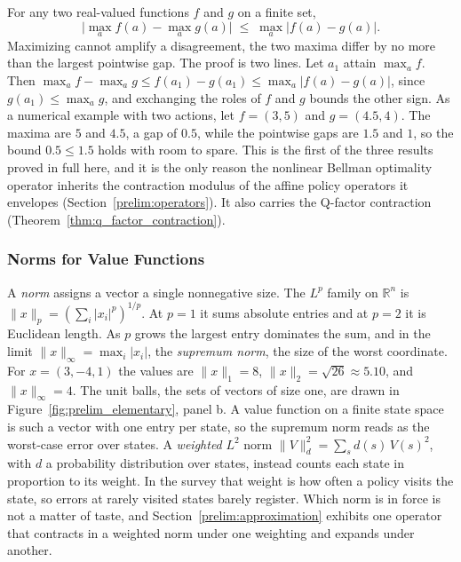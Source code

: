 For any two real-valued functions $f$ and $g$ on a finite set,
\begin{equation}
\big| \max_a f(a) - \max_a g(a) \big| \;\leq\; \max_a |f(a) - g(a)|.
\label{eq:prelim_maxdiff}
\end{equation}
Maximizing cannot amplify a disagreement, the two maxima differ by no more than the largest pointwise gap. The proof is two lines. Let $a_1$ attain $\max_a f$. Then $\max_a f - \max_a g \leq f(a_1) - g(a_1) \leq \max_a |f(a) - g(a)|$, since $g(a_1) \leq \max_a g$, and exchanging the roles of $f$ and $g$ bounds the other sign. As a numerical example with two actions, let $f = (3, 5)$ and $g = (4.5, 4)$. The maxima are $5$ and $4.5$, a gap of $0.5$, while the pointwise gaps are $1.5$ and $1$, so the bound $0.5 \leq 1.5$ holds with room to spare. This is the first of the three results proved in full here, and it is the only reason the nonlinear Bellman optimality operator inherits the contraction modulus of the affine policy operators it envelopes (Section~\ref{prelim:operators}). It also carries the Q-factor contraction (Theorem~\ref{thm:q_factor_contraction}).

\subsubsection{Norms for Value Functions}
\label{prelim:norms}

A \emph{norm} assigns a vector a single nonnegative size. The $L^p$ family on $\mathbb{R}^n$ is $\|x\|_p = (\sum_i |x_i|^p)^{1/p}$. At $p = 1$ it sums absolute entries and at $p = 2$ it is Euclidean length. As $p$ grows the largest entry dominates the sum, and in the limit $\|x\|_\infty = \max_i |x_i|$, the \emph{supremum norm}, the size of the worst coordinate. For $x = (3, -4, 1)$ the values are $\|x\|_1 = 8$, $\|x\|_2 = \sqrt{26} \approx 5.10$, and $\|x\|_\infty = 4$. The unit balls, the sets of vectors of size one, are drawn in Figure~\ref{fig:prelim_elementary}, panel b. A value function on a finite state space is such a vector with one entry per state, so the supremum norm reads as the worst-case error over states. A \emph{weighted} $L^2$ norm $\|V\|_d^2 = \sum_s d(s)\, V(s)^2$, with $d$ a probability distribution over states, instead counts each state in proportion to its weight. In the survey that weight is how often a policy visits the state, so errors at rarely visited states barely register. Which norm is in force is not a matter of taste, and Section~\ref{prelim:approximation} exhibits one operator that contracts in a weighted norm under one weighting and expands under another.

